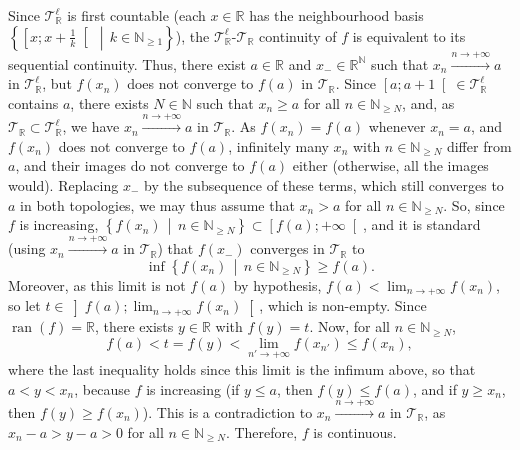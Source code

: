 \begin{solution}
    Since \( \mathcal{T}_{\mathbb{R}}^{\ell} \) is first countable (each \( x \in \mathbb{R} \) has the neighbourhood basis \( \left\{ \left[x;x+\frac{1}{k}\right[ \,\middle|\, k \in \mathbb{N}_{\geq 1} \right\} \)), the \( \mathcal{T}_{\mathbb{R}}^{\ell} \)-\( \mathcal{T}_{\mathbb{R}} \) continuity of \( f \) is equivalent to its sequential continuity. Thus, there exist \( a \in \mathbb{R} \) and \( x_{-} \in \mathbb{R}^{\mathbb{N}} \) such that \( x_n \overset{n \to +\infty}{\longrightarrow} a \) in \( \mathcal{T}_{\mathbb{R}}^{\ell} \), but \( f\left(x_n\right) \) does not converge to \( f\left(a\right) \) in \( \mathcal{T}_{\mathbb{R}} \). Since \( \left[a;a+1\right[ \in \mathcal{T}_{\mathbb{R}}^{\ell} \) contains \( a \), there exists \( N \in \mathbb{N} \) such that \( x_n \geq a \) for all \( n \in \mathbb{N}_{\geq N} \), and, as \( \mathcal{T}_{\mathbb{R}} \subset \mathcal{T}_{\mathbb{R}}^{\ell} \), we have \( x_n \overset{n \to +\infty}{\longrightarrow} a \) in \( \mathcal{T}_{\mathbb{R}} \). As \( f\left(x_n\right) = f\left(a\right) \) whenever \( x_n = a \), and \( f\left(x_n\right) \) does not converge to \( f\left(a\right) \), infinitely many \( x_n \) with \( n \in \mathbb{N}_{\geq N} \) differ from \( a \), and their images do not converge to \( f\left(a\right) \) either (otherwise, all the images would). Replacing \( x_{-} \) by the subsequence of these terms, which still converges to \( a \) in both topologies, we may thus assume that \( x_n > a \) for all \( n \in \mathbb{N}_{\geq N} \). So, since \( f \) is increasing, \( \left\{ f\left(x_n\right) \,\middle|\, n \in \mathbb{N}_{\geq N} \right\} \subset \left[f\left(a\right);+\infty\right[ \), and it is standard (using \( x_n \overset{n \to +\infty}{\longrightarrow} a \) in \( \mathcal{T}_{\mathbb{R}} \)) that \( f\left(x_{-}\right) \) converges in \( \mathcal{T}_{\mathbb{R}} \) to
    \[
        \inf\left\{ f\left(x_n\right) \,\middle|\, n \in \mathbb{N}_{\geq N} \right\} \geq f\left(a\right).
    \]
    Moreover, as this limit is not \( f\left(a\right) \) by hypothesis, \( f\left(a\right) < \lim_{n \to +\infty} f\left(x_n\right) \), so let \( t \in \left]f\left(a\right);\lim_{n \to +\infty} f\left(x_n\right)\right[ \), which is non-empty. Since \( \operatorname{ran}\left(f\right) = \mathbb{R} \), there exists \( y \in \mathbb{R} \) with \( f\left(y\right) = t \). Now, for all \( n \in \mathbb{N}_{\geq N} \),
    \[
        f\left(a\right) < t = f\left(y\right) < \lim_{n' \to +\infty} f\left(x_{n'}\right) \leq f\left(x_n\right),
    \]
    where the last inequality holds since this limit is the infimum above, so that \( a < y < x_n \), because \( f \) is increasing (if \( y \leq a \), then \( f\left(y\right) \leq f\left(a\right) \), and if \( y \geq x_n \), then \( f\left(y\right) \geq f\left(x_n\right) \)). This is a contradiction to \( x_n \overset{n \to +\infty}{\longrightarrow} a \) in \( \mathcal{T}_{\mathbb{R}} \), as \( x_n-a > y-a > 0 \) for all \( n \in \mathbb{N}_{\geq N} \). Therefore, \( f \) is continuous.

\end{solution}
